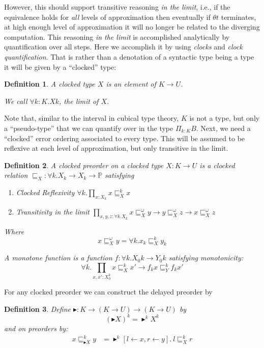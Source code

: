 \documentclass{article}
\newtheorem{definition}{Definition}[section]
\newcommand{\prop}{\mathbb P}
\newcommand{\later}{{\blacktriangleright}}
\newcommand{\kltp}[2]{\mathrel{\sqsubseteq^{#1}_{#2}}}
\begin{document}
However, this should support transitive reasoning \emph{in the limit},
i.e., if the equivalence holds for \emph{all} levels of approximation
then eventually if $\theta t$ terminates, at high enough level of
approximation it will no longer be related to the diverging
computation.
%
This reasoning \emph{in the limit} is accomplished analytically by
quantification over all steps.
%
Here we accomplish it by using \emph{clocks} and \emph{clock
quantification}.
%
That is rather than a denotation of a syntactic type being a type it
will be given by a ``clocked'' type:

\begin{definition}
  A \emph{clocked} type $X$ is an element of $K \to U$.

  We call $\forall k:K. X k$, the \emph{limit} of $X$.
\end{definition}

Note that, similar to the interval in cubical type theory, $K$ is not
a type, but only a ``pseudo-type'' that we can quantify over in the
type $\Pi_{k:K} B$.
%
Next, we need a ``clocked'' error ordering associated to every type.
%
This will be assumed to be reflexive at each level of approximation,
but only transitive in the limit.

\begin{definition}
  A \emph{clocked} preorder on a clocked type $X : K \to U$ is a
  clocked relation $\kltp {} X : \forall k. X_k \to X_k \to \prop$ satisfying
  \begin{enumerate}
  \item Clocked Reflexivity $\forall k. \prod_{x:X_k} x \kltp k X x$
  \item Transitivity in the limit $\prod_{x,y,z:\forall k. X_k} x \kltp \omega X y \to y \kltp \omega X z \to x \kltp \omega X z$
  \end{enumerate}

  Where 
  \[ x \kltp \omega X y = \forall k. x_k \kltp k X y_k \]

  A \emph{monotone function} is a function $f : \forall k. X_0 k \to
  Y_0 k$ satisfying monotonicity:
  \[ \forall k.\prod_{x,x':X_0^k} x \kltp k X x' \to f_k x \kltp k Y f_k x' \]
\end{definition}

For any clocked preorder we can construct the delayed preorder by
\begin{definition}
  Define $\later : K \to (K \to U) \to (K \to U)$ by
  \[ (\later X)^k = \later^k X^k \]
  and on preorders by:
  \begin{align*}
    x \kltp k {\later X} y &= \later^k[l\leftarrow x, r\leftarrow y].~l \kltp k {X} r
  \end{align*}
  
\end{definition}
\end{document}
